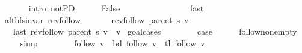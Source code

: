 \begin{isabellebody}
\ \ \ \ \ \ \isamarkupfalse%
\ {\isacharparenleft}{\kern0pt}intro\ not{\isacharunderscore}{\kern0pt}P{\isacharprime}{\kern0pt}D{\isacharparenleft}{\kern0pt}{}{\isacharparenright}{\kern0pt}{\isacharparenright}{\kern0pt}\isanewline
\ \ \ \ \isamarkupfalse%
\ False\isanewline
\ \ \ \ \ \ \isamarkupfalse%
\ {}\isanewline
\ \ \ \ \ \ \isamarkupfalse%
\ fast\isanewline
\ \ \isamarkupfalse%
\isanewline
{}\isamarkupfalse%
%
\endisatagproof
{\isafoldproof}%
%
\isadelimproof
\isanewline
%
\endisadelimproof
%
\isadeliminvisible
\isanewline
%
\endisadeliminvisible
%
\isataginvisible
{}\isamarkupfalse%
\ {\isacharparenleft}{\kern0pt}\ alt{\isacharunderscore}{\kern0pt}bfs{\isacharunderscore}{\kern0pt}invar{\isacharparenright}{\kern0pt}\ rev{\isacharunderscore}{\kern0pt}follow{\isacharcolon}{\kern0pt}\isanewline
\ \ \isanewline
\ \ \ \ {\isachardoublequoteopen}rev{\isacharunderscore}{\kern0pt}follow\ {\isacharparenleft}{\kern0pt}parent\ s{\isacharparenright}{\kern0pt}\ v\ {\isasymnoteq}\ {\isacharbrackleft}{\kern0pt}{\isacharbrackright}{\kern0pt}{\isachardoublequoteclose}\isanewline
\ \ \ \ {\isachardoublequoteopen}last\ {\isacharparenleft}{\kern0pt}rev{\isacharunderscore}{\kern0pt}follow\ {\isacharparenleft}{\kern0pt}parent\ s{\isacharparenright}{\kern0pt}\ v{\isacharparenright}{\kern0pt}\ {\isacharequal}{\kern0pt}\ v{\isachardoublequoteclose}%
\endisataginvisible
{\isafoldinvisible}%
%
\isadeliminvisible
\isanewline
%
\endisadeliminvisible
%
\isadelimproof
%
\endisadelimproof
%
\isatagproof
{}\isamarkupfalse%
\ {\isacharparenleft}{\kern0pt}goal{\isacharunderscore}{\kern0pt}cases{\isacharparenright}{\kern0pt}\isanewline
\ \ \isamarkupfalse%
\ {}\isanewline
\ \ \isamarkupfalse%
\ {\isacharquery}{\kern0pt}case\isanewline
\ \ \ \ \isamarkupfalse%
\ follow{\isacharunderscore}{\kern0pt}non{\isacharunderscore}{\kern0pt}empty\isanewline
\ \ \ \ \isamarkupfalse%
\ simp\isanewline
{}\isamarkupfalse%
\isanewline
\ \ \isamarkupfalse%
\ {}\isanewline
\ \ \isamarkupfalse%
\ {\isachardoublequoteopen}follow\ v\ {\isacharequal}{\kern0pt}\ hd\ {\isacharparenleft}{\kern0pt}follow\ v{\isacharparenright}{\kern0pt}\ {\isacharhash}{\kern0pt}\ tl\ {\isacharparenleft}{\kern0pt}follow\ v{\isacharparenright}{\kern0pt}{\isachardoublequoteclose}\isanewline
\ \ \ \ \isamarkupfalse%

\end{isabellebody}
